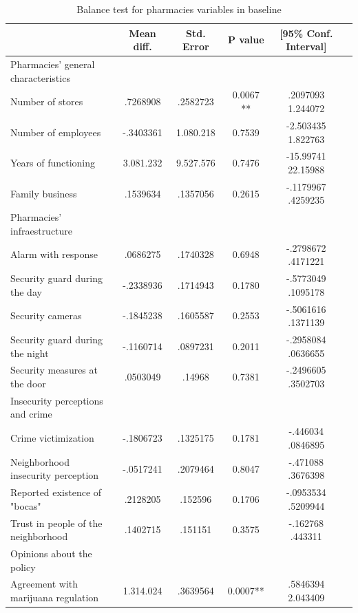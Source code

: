 \documentclass[11pt]{article}
\begin{document}
\begin{table}
    \begin{small}
    \centering
    \caption{Balance test for pharmacies variables in baseline}
    \addtolength{\tabcolsep}{-3pt}
    \label{tab:pharmaciesperceptions}
    \begin{tabular}{lccccc}
	&	Mean diff.	&	Std. Error	&	P value	&	[95\% Conf. Interval]		\\	\hline
Pharmacies' general characteristics	&		&		&		&			\\	\hline
Number of stores 	&	.7268908 	&	.2582723	&	0.0067 **	&	.2097093    1.244072		\\	
Number of employees	&	-.3403361	&	1.080.218	&	 0.7539	&	-2.503435    1.822763		\\	
Years of functioning	&	3.081.232	&	9.527.576	&	0.7476	&	-15.99741    22.15988		\\	
Family business	&	.1539634 	&	 .1357056 	&	0.2615 	&	-.1179967    .4259235		\\	
Pharmacies' infraestructure	&		&		&		&			\\	\hline
Alarm with response	&	.0686275	&	.1740328 	&	 0.6948	&	-.2798672    .4171221		\\	
Security guard during the day 	&	-.2338936	&	 .1714943	&	0.1780 	&	-.5773049    .1095178		\\	
Security cameras 	&	 -.1845238	&	 .1605587	&	0.2553 	&	-.5061616    .1371139		\\	
Security guard during the night	&	-.1160714 	&	 .0897231	&	0.2011 	&	 -.2958084    .0636655		\\	
Security measures at the door	&	.0503049	&	.14968	&	0.7381	&	-.2496605    .3502703		\\	
Insecurity perceptions and crime	&		&		&		&			\\	\hline
Crime victimization 	&	-.1806723	&	.1325175 	&	0.1781	&	 -.446034    .0846895		\\	
Neighborhood insecurity perception	&	-.0517241	&	.2079464 	&	0.8047	&	-.471088    .3676398		\\	
Reported existence of "bocas"	&	.2128205	&	.152596	&	0.1706 	&	 -.0953534   	 .5209944	\\	
Trust in people of the neighborhood	&	.1402715	&	.151151	&	0.3575	&	-.162768     .443311		\\	
Opinions about the policy	&		&		&		&			\\	\hline
Agreement with marijuana regulation 	&	1.314.024	&	.3639564	&	0.0007**	&	.5846394    2.043409		\\	

\end{tabular}
\end{small}
\end{table}
\end{document}
